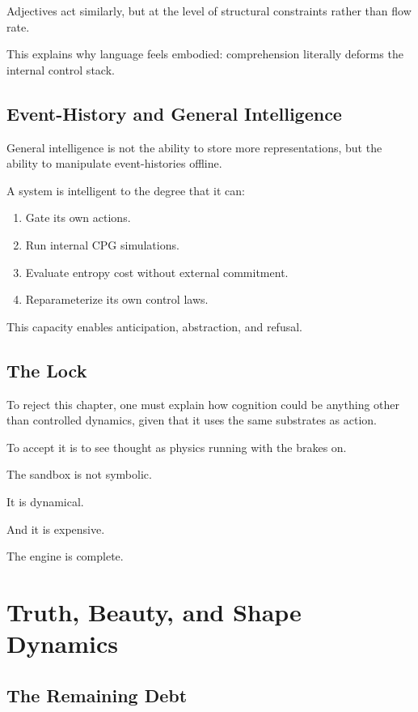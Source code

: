 \documentclass[11pt]{book}
\begin{document}
Adjectives act similarly, but at the level of structural constraints rather than flow rate.

This explains why language feels embodied: comprehension literally deforms the internal control stack.

\section{Event-History and General Intelligence}

General intelligence is not the ability to store more representations, but the ability to manipulate event-histories offline.

A system is intelligent to the degree that it can:
\begin{enumerate}
\item Gate its own actions.
\item Run internal CPG simulations.
\item Evaluate entropy cost without external commitment.
\item Reparameterize its own control laws.
\end{enumerate}

This capacity enables anticipation, abstraction, and refusal.

\section{The Lock}

To reject this chapter, one must explain how cognition could be anything other than controlled dynamics, given that it uses the same substrates as action.

To accept it is to see thought as physics running with the brakes on.

The sandbox is not symbolic.

It is dynamical.

And it is expensive.

The engine is complete.


\chapter{Truth, Beauty, and Shape Dynamics}

\section{The Remaining Debt}
\end{document}
